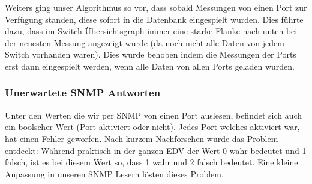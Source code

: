 Weiters ging unser Algorithmus so vor, dass sobald Messungen von einen Port zur Verfügung standen, diese sofort in die Datenbank eingespielt wurden. Dies führte dazu, dass im Switch Übersichtsgraph immer eine starke Flanke nach unten bei der neuesten Messung angezeigt wurde (da noch nicht alle Daten von jedem Switch vorhanden waren). Dies wurde behoben indem die Messungen der Ports erst dann eingespielt werden, wenn alle Daten von allen Ports geladen wurden.

\subsubsection*{Unerwartete SNMP Antworten}
Unter den Werten die wir per SNMP von einen Port auslesen, befindet sich auch ein boolscher Wert (Port aktiviert oder nicht). Jedes Port welches aktiviert war, hat einen Fehler geworfen. Nach kurzem Nachforschen wurde das Problem entdeckt: Während praktisch in der ganzen EDV der Wert 0 wahr bedeutet und 1 falsch, ist es bei diesem Wert so, dass 1 wahr und 2 falsch bedeutet. Eine kleine Anpassung in unseren SNMP Lesern lösten dieses Problem.

